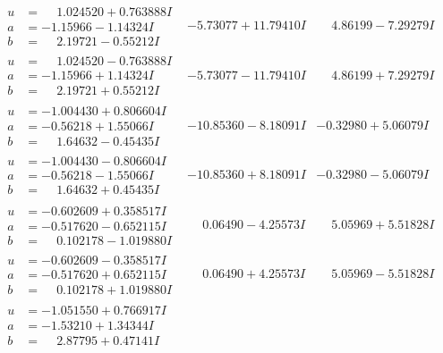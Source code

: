 \documentclass[1p]{elsarticle_modified}
\theoremstyle{definition}
\begin{document}
$$\begin{array}{c|c|c}
\begin{aligned}
u &= \phantom{-}1.024520 + 0.763888 I \\
a &= -1.15966 - 1.14324 I \\
b &= \phantom{-}2.19721 - 0.55212 I\end{aligned}
 & -5.73077 + 11.79410 I & \phantom{-}4.86199 - 7.29279 I \\ \hline\begin{aligned}
u &= \phantom{-}1.024520 - 0.763888 I \\
a &= -1.15966 + 1.14324 I \\
b &= \phantom{-}2.19721 + 0.55212 I\end{aligned}
 & -5.73077 - 11.79410 I & \phantom{-}4.86199 + 7.29279 I \\ \hline\begin{aligned}
u &= -1.004430 + 0.806604 I \\
a &= -0.56218 + 1.55066 I \\
b &= \phantom{-}1.64632 - 0.45435 I\end{aligned}
 & -10.85360 - 8.18091 I & -0.32980 + 5.06079 I \\ \hline\begin{aligned}
u &= -1.004430 - 0.806604 I \\
a &= -0.56218 - 1.55066 I \\
b &= \phantom{-}1.64632 + 0.45435 I\end{aligned}
 & -10.85360 + 8.18091 I & -0.32980 - 5.06079 I \\ \hline\begin{aligned}
u &= -0.602609 + 0.358517 I \\
a &= -0.517620 - 0.652115 I \\
b &= \phantom{-}0.102178 - 1.019880 I\end{aligned}
 & \phantom{-}0.06490 - 4.25573 I & \phantom{-}5.05969 + 5.51828 I \\ \hline\begin{aligned}
u &= -0.602609 - 0.358517 I \\
a &= -0.517620 + 0.652115 I \\
b &= \phantom{-}0.102178 + 1.019880 I\end{aligned}
 & \phantom{-}0.06490 + 4.25573 I & \phantom{-}5.05969 - 5.51828 I \\ \hline\begin{aligned}
u &= -1.051550 + 0.766917 I \\
a &= -1.53210 + 1.34344 I \\
b &= \phantom{-}2.87795 + 0.47141 I\end{aligned}

\end{array}$$
\end{document}
